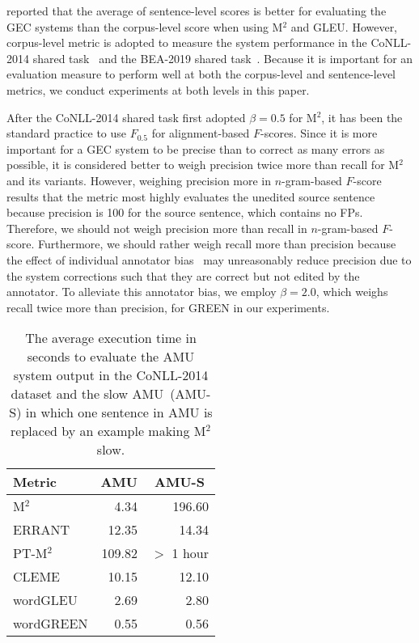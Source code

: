 \documentclass[11pt]{article}
\begin{document}
\citet{napoles-etal-2016-theres} reported that the average of sentence-level scores is better for evaluating the GEC systems than the corpus-level score when using M${}^2$ and GLEU.
However, corpus-level metric is adopted to measure the system performance in the CoNLL-2014 shared task~\citep{ng-etal-2014-conll} and the BEA-2019 shared task~\citep{bryant-etal-2019-bea}.
Because it is important for an evaluation measure to perform well at both the corpus-level and sentence-level metrics, we conduct experiments at both levels in this paper.

After the CoNLL-2014 shared task first adopted $\beta = 0.5$ for M${}^2$, it has been the standard practice to use $F_{0.5}$ for alignment-based $F$-scores.
Since it is more important for a GEC system to be precise than to correct as many errors as possible, it is considered better to weigh precision twice more than recall for M${}^2$ and its variants.
However, weighing precision more in $n$-gram-based $F$-score results that the metric most highly evaluates the unedited source sentence because precision is 100 for the source sentence, which contains no \textsf{FP}s.
Therefore, we should not weigh precision more than recall in $n$-gram-based $F$-score.
Furthermore, we should rather weigh recall more than precision because the effect of individual annotator bias~\citep{bryant-ng-2015-far} may unreasonably reduce precision due to the system corrections such that they are correct but not edited by the annotator.
To alleviate this annotator bias, we employ $\beta = 2.0$, which weighs recall twice more than precision, for GREEN in our experiments.

\begin{table}[!t]
    \centering
    \begin{tabular}{lrr}
        \hline 
        \multicolumn{1}{l}{Metric} &
        \multicolumn{1}{c}{\textsf{AMU}} &
        \multicolumn{1}{c}{\textsf{AMU-S}} \\ \hline
        M${}^2$ & 4.34 & 196.60 \\
        ERRANT & 12.35 & 14.34 \\
        PT-M${}^2$ & 109.82 & $>$ 1 hour \\
        CLEME & 10.15 & 12.10 \\
        wordGLEU & 2.69 & 2.80 \\
        wordGREEN & 0.55 & 0.56 \\ \hline
    \end{tabular}
    \caption{The average execution time in seconds to evaluate the \textsf{AMU} system output in the CoNLL-2014 dataset and the slow \textsf{AMU}~(\textsf{AMU-S}) in which one sentence in \textsf{AMU} is replaced by an example making M${}^2$ slow.}
    \label{tab:time}
\end{table}
\end{document}
